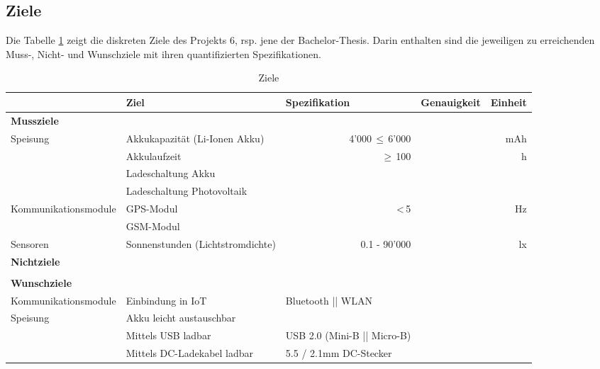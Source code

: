 \begin{landscape}
\subsection{Ziele}
Die Tabelle \ref{tab:ZieleP6} zeigt die diskreten Ziele des Projekts 6, rsp. jene der Bachelor-Thesis. Darin enthalten sind die jeweiligen zu erreichenden Muss-, Nicht- und Wunschziele mit ihren quantifizierten Spezifikationen.\\

\begin{table}[htbp]
  \centering
  \renewcommand{\arraystretch}{1.4}
  \caption{Ziele}
    \begin{tabular}{l|l|l|r|r}
          & \textbf{Ziel} & \multicolumn{1}{l|}{\textbf{Spezifikation}} & \multicolumn{1}{l|}{\textbf{Genauigkeit}} & \multicolumn{1}{l}{\textbf{Einheit}} \\
    \toprule
    \multicolumn{1}{l}{\textbf{Mussziele}} & \multicolumn{4}{r}{} \\
    \toprule
    \multirow{4}{*}{Speisung} & Akkukapazität (Li-Ionen Akku) & \multicolumn{1}{r|}{4'000\,$\leq$\,6'000} &  & mAh \\
\cline{2-5}           & Akkulaufzeit & \multicolumn{1}{r|}{$\geq$\,100} &   & h \\
\cline{2-5}          & Ladeschaltung Akku &       &       &  \\
\cline{2-5}           & Ladeschaltung Photovoltaik &       &       &  \\
    \hline
    \multirow{2}{*}{Kommunikationsmodule} & GPS-Modul   &  \multicolumn{1}{r|}{<\,5}  &       & Hz \\
\cline{2-5}          & GSM-Modul  &       &       &  \\
\hline
Sensoren & Sonnenstunden (Lichtstromdichte) & \multicolumn{1}{r|}{0.1 - 90'000} & & lx \\
    \bottomrule
    \multicolumn{1}{l}{\textbf{Nichtziele}} & \multicolumn{4}{r}{} \\
    \toprule
    & & & & \\
    \bottomrule
    \multicolumn{1}{l}{\textbf{Wunschziele}} & \multicolumn{4}{r}{} \\
    \toprule
    Kommunikationsmodule & Einbindung in IoT &       Bluetooth || WLAN &       &  \\
    \hline
    \multirow{3}{*}{Speisung} & Akku leicht austauschbar &       &       &  \\
\cline{2-5}  & Mittels USB ladbar & USB 2.0 (Mini-B || Micro-B) &       &  \\
\cline{2-5}  & Mittels DC-Ladekabel ladbar &      5.5 / 2.1mm DC-Stecker &       &  \\
    \bottomrule
    \end{tabular}%
  \label{tab:ZieleP6}%
\end{table}%


\end{landscape}
